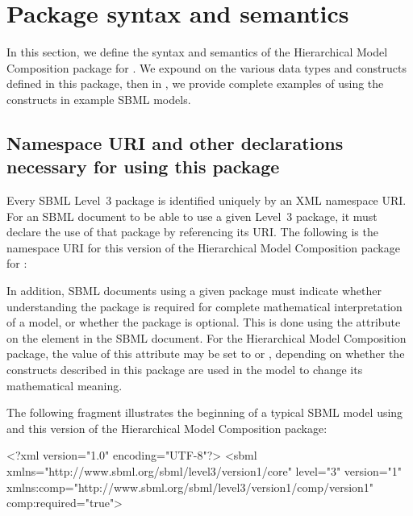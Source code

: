 
\newcommand{\fixttspace}{\hspace*{1pt}}

\section{Package syntax and semantics}
\label{sec:syntax}

In this section, we define the syntax and semantics of the Hierarchical
Model Composition package for \sbmlthreecore.  We expound on the
various data types and constructs defined in this package, then in
, we provide complete examples of using the constructs in
example SBML models.

\subsection{Namespace URI and other declarations necessary for using this package}
\label{xml-namespace}

Every SBML Level~3 package is identified uniquely by an XML namespace
URI.  For an SBML document to be able to use a given Level~3
package, it must declare the use of that package by referencing its URI.
The following is the namespace URI for this version of the Hierarchical
Model Composition package for \sbmlthreecore:
\begin{center}
\end{center}

In addition, SBML documents using a given package must indicate whether
understanding the package is required for complete mathematical
interpretation of a model, or whether the package is optional.  This is
done using the attribute  on the  element
in the SBML document.  For the Hierarchical Model Composition package,
the value of this attribute may be set to  or ,
depending on whether the constructs described in this package are used
in the model to change its mathematical meaning.

The following fragment illustrates the beginning of a typical SBML model
using \sbmlthreecore and this version of the Hierarchical Model
Composition package:

\begin{example}
<?xml version="1.0" encoding="UTF-8"?>
<sbml xmlns="http://www.sbml.org/sbml/level3/version1/core" level="3" version="1"
      xmlns:comp="http://www.sbml.org/sbml/level3/version1/comp/version1" comp:required="true">
\end{example}
    

